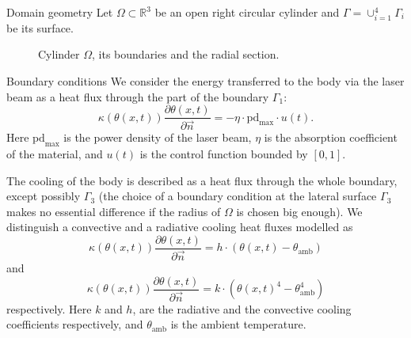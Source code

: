 \documentclass[
	9pt,
	hyperref = {unicode,pdfpagelabels=false},
	notheorems,
	aspectratio=169
	]{beamer}
\begin{document}
\begin{frame}{Domain geometry}
Let $\Omega	\subset \mathbb{R}^3$ be an open right circular cylinder and $\Gamma = \cup_{i=1}^4 \Gamma_i$ be its surface.

	\begin{figure}
		 
		\caption{Cylinder $\Omega$, its boundaries and the radial section.}
	\end{figure}
\end{frame}


\begin{frame}{Boundary conditions}
We consider the energy transferred to the body via the laser beam as a heat flux through the part of the boundary $\Gamma_1$:
\begin{equation}
	\kappa(\theta(x,t)) \frac{\partial \theta(x,t)}{\partial \vec{n}} = - \eta \cdot \text{pd}_{\max} \cdot u(t).
\end{equation}
Here $\text{pd}_{\max}$ is the power density of the laser beam, $\eta$ is the absorption coefficient of the material, and $u(t)$ is the control function bounded by $[0,1]$.

The cooling of the body is described as a heat flux through the whole boundary, except possibly $\Gamma_3$ (the choice of a boundary condition at the lateral surface $\Gamma_3$ makes no essential difference if the radius of $\Omega$ is chosen big enough).
We distinguish a convective and a radiative cooling heat fluxes modelled as
\begin{equation}
	\kappa(\theta(x,t)) \frac{\partial \theta(x,t)}{\partial \vec{n}} = h \cdot (\theta(x,t) - \theta_\text{amb})
\end{equation}
and
\begin{equation}
	\kappa(\theta(x,t)) \frac{\partial \theta(x,t)}{\partial \vec{n}} = k \cdot (\theta(x,t)^4 - \theta^4_\text{amb})
\end{equation}
respectively.
Here $k$ and $h$, are the radiative and the convective cooling coefficients respectively, and $\theta_\text{amb}$ is the ambient temperature.
\end{frame}
\end{document}

